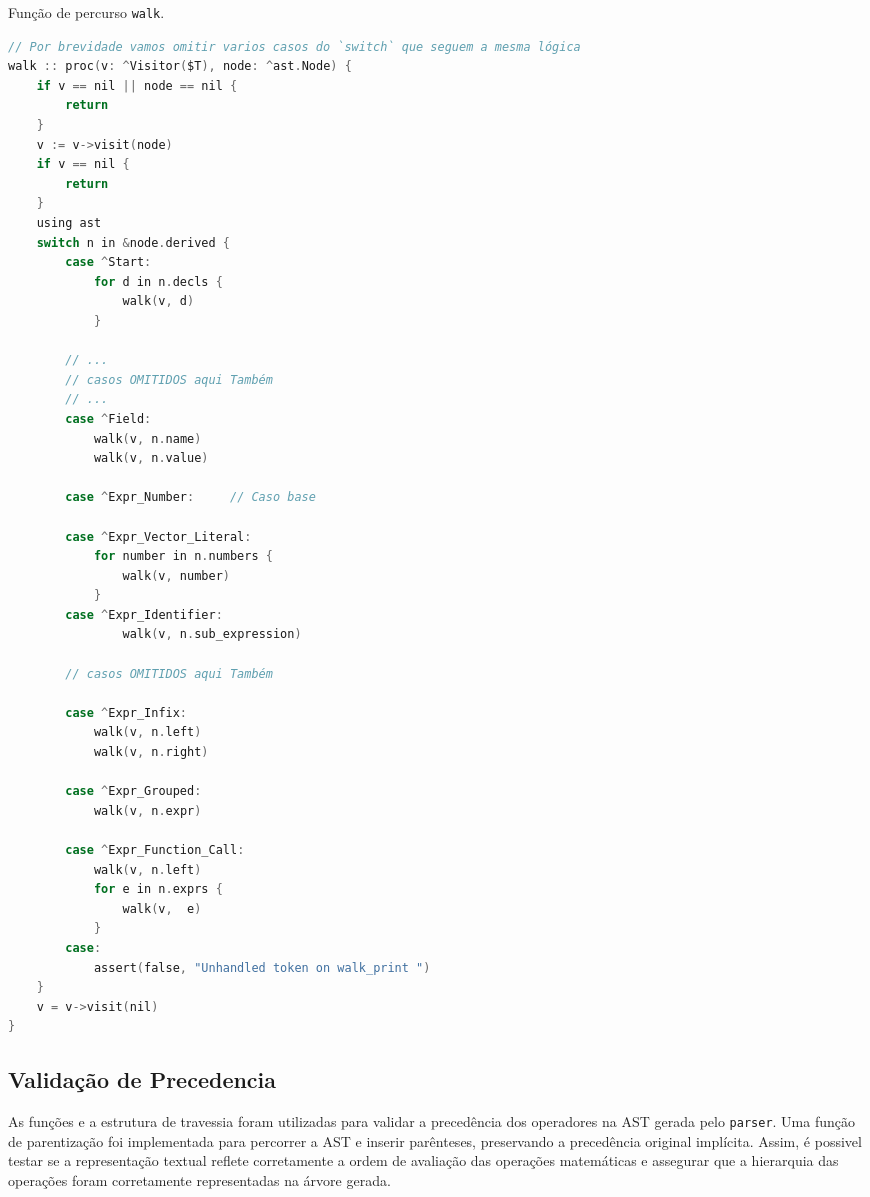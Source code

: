 \begin{codigo}[ht]
\caption{\small Função de percurso \texttt{walk}. }
        \label{cod-visitor-walk}
\begin{lstlisting}[language = C]
// Por brevidade vamos omitir varios casos do `switch` que seguem a mesma lógica
walk :: proc(v: ^Visitor($T), node: ^ast.Node) {
    if v == nil || node == nil {
        return
    }
    v := v->visit(node)
    if v == nil {
        return
    }
    using ast
    switch n in &node.derived {
        case ^Start:
            for d in n.decls {
                walk(v, d)
            }

        // ...
        // casos OMITIDOS aqui Também
        // ...
        case ^Field:
            walk(v, n.name)
            walk(v, n.value)

        case ^Expr_Number:     // Caso base

        case ^Expr_Vector_Literal:
            for number in n.numbers {
                walk(v, number)
            }
        case ^Expr_Identifier:
                walk(v, n.sub_expression)

        // casos OMITIDOS aqui Também

        case ^Expr_Infix:
            walk(v, n.left)
            walk(v, n.right)

        case ^Expr_Grouped:
            walk(v, n.expr)

        case ^Expr_Function_Call:
            walk(v, n.left)
            for e in n.exprs {
                walk(v,  e)
            }
        case:
            assert(false, "Unhandled token on walk_print ")
    }
    v = v->visit(nil)
}

  \end{lstlisting}
\end{codigo}


\subsection{Validação de Precedencia}
As funções e a estrutura de travessia foram utilizadas para validar a precedência dos operadores na AST gerada pelo \texttt{parser}. Uma função de parentização foi implementada para percorrer a AST e inserir parênteses, preservando a precedência original implícita. Assim, é possivel testar se a representação textual reflete corretamente a ordem de avaliação das operações matemáticas e assegurar que a hierarquia das operações foram corretamente representadas na árvore gerada.

